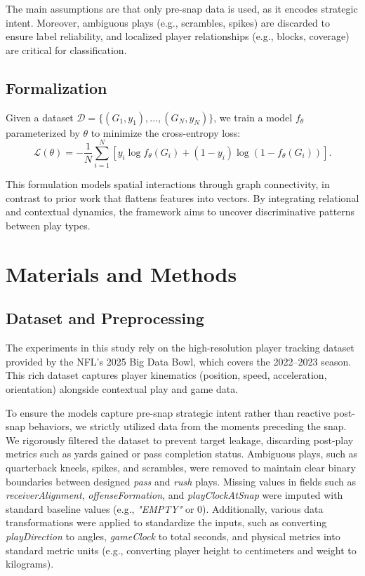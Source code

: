 \documentclass[runningheads]{llncs}
\begin{document}
The main assumptions are that only pre-snap data is used, as it encodes strategic intent. Moreover, ambiguous plays (e.g., scrambles, spikes) are discarded to ensure label reliability, and localized player relationships (e.g., blocks, coverage) are critical for classification.

\subsection{Formalization}
Given a dataset \( \mathcal{D} = \{(G_1, y_1), \ldots, (G_N, y_N)\} \), we train a model \( f_\theta \) parameterized by \( \theta \) to minimize the cross-entropy loss:
\begin{equation}
    \mathcal{L}(\theta) = -\frac{1}{N} \sum_{i=1}^N \left[ y_i \log f_\theta(G_i) + (1 - y_i) \log (1 - f_\theta(G_i)) \right].
\end{equation}

This formulation models spatial interactions through graph connectivity, in contrast to prior work that flattens features into vectors. By integrating relational and contextual dynamics, the framework aims to uncover discriminative patterns between play types.

\section{Materials and Methods}
\label{sec:methodology}

\subsection{Dataset and Preprocessing}
\label{subsec:data_preprocessing}

The experiments in this study rely on the high-resolution player tracking dataset provided by the NFL's 2025 Big Data Bowl, which covers the 2022--2023 season. This rich dataset captures player kinematics (position, speed, acceleration, orientation) alongside contextual play and game data. 

To ensure the models capture pre-snap strategic intent rather than reactive post-snap behaviors, we strictly utilized data from the moments preceding the snap. We rigorously filtered the dataset to prevent target leakage, discarding post-play metrics such as yards gained or pass completion status. Ambiguous plays, such as quarterback kneels, spikes, and scrambles, were removed to maintain clear binary boundaries between designed \textit{pass} and \textit{rush} plays. Missing values in fields such as \textit{receiverAlignment}, \textit{offenseFormation}, and \textit{playClockAtSnap} were imputed with standard baseline values (e.g., \textit{"EMPTY"} or 0). Additionally, various data transformations were applied to standardize the inputs, such as converting \textit{playDirection} to angles, \textit{gameClock} to total seconds, and physical metrics into standard metric units (e.g., converting player height to centimeters and weight to kilograms).
\end{document}
